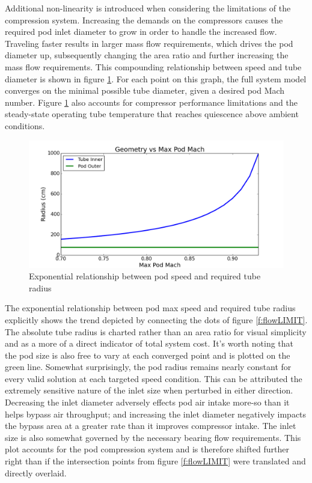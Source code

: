 \documentclass[heading.tex]{subfiles}
\begin{document}
 Additional non-linearity is introduced when
considering the limitations of the compression system. Increasing the demands on the compressors
causes the required pod inlet diameter to grow in order to handle the increased flow. Traveling faster results in larger mass flow requirements,
which drives the pod diameter up, subsequently changing the area ratio and further increasing the mass flow requirements.
This compounding relationship between 
speed and tube diameter is shown in figure \ref{f:machRAD}. For each point on this graph, the full system model converges on the minimal
possible tube diameter, given a desired pod Mach number. Figure \ref{f:machRAD} also accounts for compressor performance limitations and
the steady-state operating tube temperature that reaches quiescence above ambient conditions.

\begin{figure}[hbtp]
\centering
\includegraphics[width=\textwidth]{images/mach_vs_rad2.png}
\caption{Exponential relationship between pod speed and required tube radius}
\label{f:machRAD}
\end{figure}

The exponential relationship between pod max speed and required tube radius explicitly shows the trend depicted by
connecting the dots of figure \ref{f:flowLIMIT}. The absolute tube radius is charted rather than an area ratio for visual simplicity
and as a more of a direct indicator of total system cost. It's worth noting that the pod size is also free to vary at each converged point
and is plotted on the green line. Somewhat surprisingly, the pod radius remains
nearly constant for every valid solution at each targeted speed condition. This can be attributed the extremely sensitive nature of the inlet
size when perturbed in either direction. Decreasing the inlet diameter adversely effects pod air intake more-so than it helps
bypass air throughput; and increasing the inlet diameter negatively impacts the bypass area at a greater rate than it improves
compressor intake. The inlet size is also somewhat governed by the
necessary bearing flow requirements. This plot accounts for
the pod compression system and is therefore shifted further right than if the intersection points from figure \ref{f:flowLIMIT}
were translated and directly overlaid. 
\end{document}
